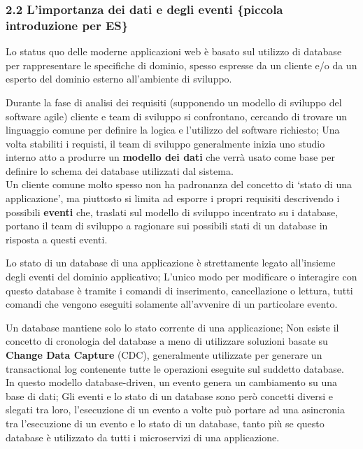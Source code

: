 \documentclass[]{article}
\begin{document}
\subsubsection{2.2 L'importanza dei dati e degli eventi \{piccola
introduzione per
ES\}}\label{limportanza-dei-dati-e-degli-eventi-piccola-introduzione-per-es}

Lo status quo delle moderne applicazioni web è basato sul utilizzo di
database per rappresentare le specifiche di dominio, spesso espresse da
un cliente e/o da un esperto del dominio esterno all'ambiente di
sviluppo.

Durante la fase di analisi dei requisiti (supponendo un modello di
sviluppo del software agile) cliente e team di sviluppo si confrontano,
cercando di trovare un linguaggio comune per definire la logica e
l'utilizzo del software richiesto; Una volta stabiliti i requisti, il
team di sviluppo generalmente inizia uno studio interno atto a produrre
un \textbf{modello dei dati} che verrà usato come base per definire lo
schema dei database utilizzati dal sistema.\\
Un cliente comune molto spesso non ha padronanza del concetto di `stato
di una applicazione', ma piuttosto si limita ad esporre i propri
requisiti descrivendo i possibili \textbf{eventi} che, traslati sul
modello di sviluppo incentrato su i database, portano il team di
sviluppo a ragionare sui possibili stati di un database in risposta a
questi eventi.

Lo stato di un database di una applicazione è strettamente legato
all'insieme degli eventi del dominio applicativo; L'unico modo per
modificare o interagire con questo database è tramite i comandi di
inserimento, cancellazione o lettura, tutti comandi che vengono eseguiti
solamente all'avvenire di un particolare evento.

Un database mantiene solo lo stato corrente di una applicazione; Non
esiste il concetto di cronologia del database a meno di utilizzare
soluzioni basate su \textbf{Change Data Capture} (CDC), generalmente
utilizzate per generare un transactional log contenente tutte le
operazioni eseguite sul suddetto database.\\
In questo modello database-driven, un evento genera un cambiamento su
una base di dati; Gli eventi e lo stato di un database sono però
concetti diversi e slegati tra loro, l'esecuzione di un evento a volte
può portare ad una asincronia tra l'esecuzione di un evento e lo stato
di un database, tanto più se questo database è utilizzato da tutti i
microservizi di una applicazione.
\end{document}
